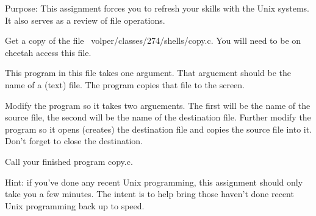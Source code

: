 

\parindent 0pt

Purpose: This assignment forces you to refresh your skills with the Unix
systems.
It also serves as a review of file operations.

Get a copy of the file {\ltt{}~volper/classes/274/shells/copy.c}.
You will need to be on {\ltt{}cheetah} access this file.

This program in this file takes one argument. 
That arguement should be the name of a (text) file.
The program copies that file to the screen.

Modify the program so it takes two arguements.
The first will be the name of the source file, the second
will be the name of the destination file.
Further modify the program so it opens (creates) the destination
file and copies the source file into it.
Don't forget to close the destination.

Call your finished program {\ltt{}copy.c}.

Hint: if you've done any recent Unix programming, this assignment
should only take you a few minutes.
The intent is to help bring those haven't done recent Unix programming
back up to speed.
\bye
